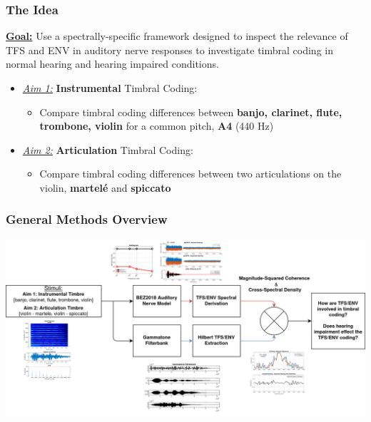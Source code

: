 \documentclass[aspectratio=1610]{beamer}
\begin{document}
\begin{frame}
\frametitle{The Idea}

\textbf{\underline{Goal:}} Use a spectrally-specific framework designed to inspect the relevance of TFS and ENV in auditory nerve responses to investigate timbral coding in normal hearing and hearing impaired conditions. \vspace{1em}
\begin{itemize}
\item \textit{\underline{Aim 1:}} \textbf{Instrumental} Timbral Coding:
\begin{itemize}[label = $\blacktriangleright$]
\item Compare timbral coding differences between \textbf{banjo, clarinet, flute, trombone, violin} for a common pitch, \textbf{A4} (440 Hz)
\end{itemize}\vspace{1em}

\item \textit{\underline{Aim 2:}} \textbf{Articulation} Timbral Coding:
\begin{itemize}[label = $\blacktriangleright$]
\item Compare timbral coding differences between two articulations on the violin, \textbf{martel\'{e}} and \textbf{spiccato}
\end{itemize}

\end{itemize}
\end{frame}

\begin{frame}
\frametitle{General Methods Overview}


\centering

\includegraphics[height = .77\textheight]{methods_pics}

\end{frame}
\end{document}
